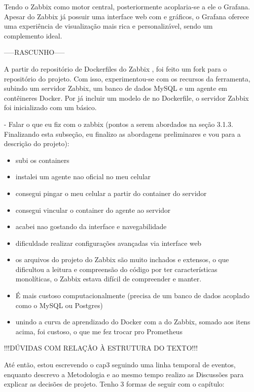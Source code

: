 {Tendo o Zabbix como motor central, posteriormente acoplaria-se a ele o Grafana. Apesar do Zabbix já possuir uma interface web com  e gráficos, o Grafana oferece uma experiência de visualização mais rica e personalizável, sendo um complemento ideal.


{\color{blue}
-----RASCUNHO-----

A partir do repositório de Dockerfiles do Zabbix \citep{zabbixdocker2025}, foi feito um fork para o repositório do projeto. Com isso, experimentou-se com os recursos da ferramenta, subindo um servidor Zabbix, um banco de dados MySQL e um agente em contêineres Docker. Por já incluir um modelo de  no Dockerfile, o servidor Zabbix foi inicializado com um  básico.


- Falar o que eu fiz com o zabbix (pontos a serem abordados na seção 3.1.3. Finalizando esta subseção, eu finalizo as abordagens preliminares e vou para a descrição do projeto):
    \begin{itemize}
        \item subi os containers
        \item instalei um agente nao oficial no meu celular
        \item consegui pingar o meu celular a partir do container do servidor
        \item consegui vincular o container do agente ao servidor
        \item acabei nao gostando da interface e navegabilidade
        \item dificuldade realizar configurações avançadas via interface web
        \item os arquivos do projeto do Zabbix são muito inchados e extensos, o que dificultou a leitura e compreensão do código por ter características monolíticas, o Zabbix estava difícil de compreender e manter.
        \item É mais custoso computacionalmente (precisa de um banco de dados acoplado como o MySQL ou Postgres)
        \item unindo a curva de aprendizado do Docker com a do Zabbix, somado aos itens acima, foi custoso, o que me fez trocar pro Prometheus 
    
    \end{itemize}
     
    !!!DÚVIDAS COM RELAÇÃO À ESTRUTURA DO TEXTO!!!

    Até então, estou escrevendo o cap3 seguindo uma linha temporal de eventos, enquanto descrevo a Metodologia e ao mesmo tempo realizo as Discussões para explicar as decisões de projeto. Tenho 3 formas de seguir com o capítulo:
    
}}
